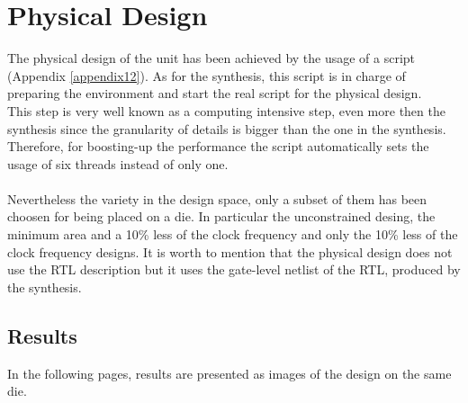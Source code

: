\chapter{Physical Design}
\label{pd}
The physical design of the unit has been achieved by the usage of a script (Appendix \ref{appendix12}). As for the synthesis, this script is in charge of preparing the environment and start the real script for the physical design.\\ This step is very well known as a computing intensive step, even more then the synthesis since the granularity of details is bigger than the one in the synthesis. Therefore, for boosting-up the performance the script automatically sets the usage of six threads instead of only one.\\\\
Nevertheless the variety in the design space, only a subset of them has been choosen for being placed on a die. In particular the unconstrained desing, the minimum area and a 10\% less of the clock frequency and only the 10\% less of the clock frequency designs. It is worth to mention that the physical design does not use the RTL description but it uses the gate-level netlist of the RTL, produced by the synthesis.\\
\section{Results}
In the following pages, results are presented as images of the design on the same die.

